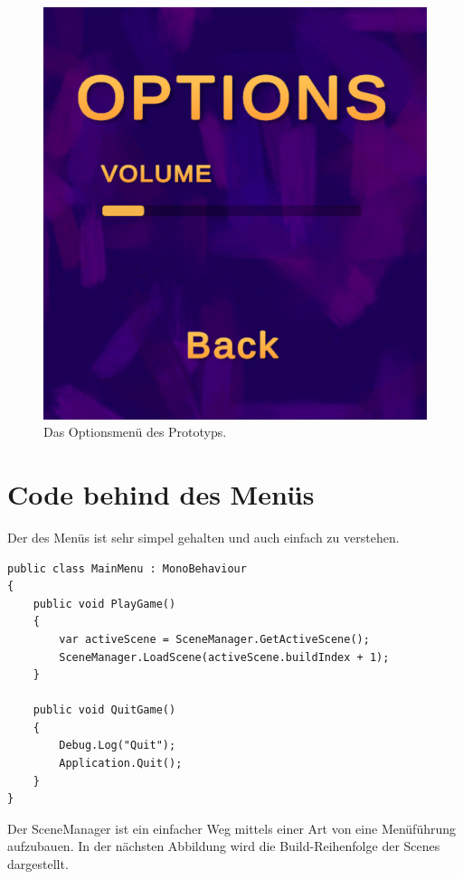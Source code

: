\begin{figure}[H]
\begin{minipage}{0.35\textwidth}
        \includegraphics[width=\linewidth]{chapters/03/images/OptionsMainMenu.png}
        \caption{Das Optionsmenü des Prototyps.}
        \label{htl02b}
    \end{minipage}
\end{figure}

\section{Code behind des Menüs}

Der  des Menüs ist sehr simpel gehalten und auch einfach zu verstehen.

\begin{lstlisting}[language=CSharp,caption={Main Menu Klasse.},label=code:mainmenu]
public class MainMenu : MonoBehaviour
{
    public void PlayGame()
    {
        var activeScene = SceneManager.GetActiveScene();
        SceneManager.LoadScene(activeScene.buildIndex + 1);
    }

    public void QuitGame()
    {
        Debug.Log("Quit");
        Application.Quit();
    }
}
\end{lstlisting}
Der SceneManager ist ein einfacher Weg mittels einer Art von  eine Menüführung aufzubauen. In der nächsten Abbildung wird die Build-Reihenfolge der Scenes dargestellt.

